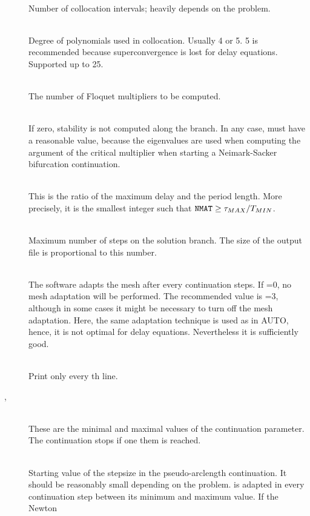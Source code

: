 \documentclass[10pt,a4paper]{ddedoc}
\begin{document}
\begin{description}
%
\item[] ~\\
Number of collocation intervals; heavily depends on the problem.
%
\item[] ~\\
Degree of polynomials used in collocation. Usually 4 or 5. 
5 is recommended because superconvergence is lost for delay equations. Supported up to 25.
%
\item[] ~\\
The number of Floquet multipliers to be computed.
%
\item[] ~\\
If zero, stability is not computed along the branch. In any case, 
must have a reasonable value, because the eigenvalues are used when computing
the argument of the critical multiplier when starting a Neimark-Sacker
bifurcation continuation.
%
\item[] ~\\
This is the ratio of the maximum delay and the period length. More precisely, it
is the smallest integer such that ${\tt NMAT} \ge \tau_{MAX}/T_{MIN}$.
%
\item[] ~\\
Maximum number of steps on the solution branch. The size of the output file is proportional to this number.
%
\item[] ~\\
The software adapts the mesh after every  continuation steps.
If =0, no mesh adaptation will be performed. The recommended value is =3,
although in some cases it might be necessary to turn off the mesh adaptation.
Here, the same adaptation technique is used as in AUTO, hence, it is not optimal for delay equations. Nevertheless it is sufficiently good.
%
\item[] ~\\
Print only every th line.
%
\item[, ] ~\\
These are the minimal and maximal values of the continuation parameter. The continuation stops if one them is reached.
%
\item[] ~\\
Starting value of the stepsize in the pseudo-arclength continuation.
It should be reasonably small depending on the problem.  is adapted in
every continuation step between its minimum and maximum value. If the Newton

\end{description}
\end{document}
